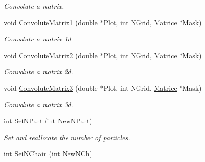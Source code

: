 \begin{DoxyCompactItemize}
\begin{DoxyCompactList}\small\item\em Convolute a matrix. \end{DoxyCompactList}\item 
void \hyperlink{classVarData_aa71815f5a54d45211d2e36f338010741}{Convolute\+Matrix1} (double $\ast$Plot, int N\+Grid, \hyperlink{classMatrice}{Matrice} $\ast$Mask)\hypertarget{classVarData_aa71815f5a54d45211d2e36f338010741}{}\label{classVarData_aa71815f5a54d45211d2e36f338010741}

\begin{DoxyCompactList}\small\item\em Convolute a matrix 1d. \end{DoxyCompactList}\item 
void \hyperlink{classVarData_a66364ab1a4bcb0748e0548b1f15447af}{Convolute\+Matrix2} (double $\ast$Plot, int N\+Grid, \hyperlink{classMatrice}{Matrice} $\ast$Mask)\hypertarget{classVarData_a66364ab1a4bcb0748e0548b1f15447af}{}\label{classVarData_a66364ab1a4bcb0748e0548b1f15447af}

\begin{DoxyCompactList}\small\item\em Convolute a matrix 2d. \end{DoxyCompactList}\item 
void \hyperlink{classVarData_a1a475106efeb1fdfddaed3f6a069d199}{Convolute\+Matrix3} (double $\ast$Plot, int N\+Grid, \hyperlink{classMatrice}{Matrice} $\ast$Mask)\hypertarget{classVarData_a1a475106efeb1fdfddaed3f6a069d199}{}\label{classVarData_a1a475106efeb1fdfddaed3f6a069d199}

\begin{DoxyCompactList}\small\item\em Convolute a matrix 3d. \end{DoxyCompactList}\item 
int \hyperlink{classVarData_a2e0b2cd0414a0994122e1dfae41e57b8}{Set\+N\+Part} (int New\+N\+Part)\hypertarget{classVarData_a2e0b2cd0414a0994122e1dfae41e57b8}{}\label{classVarData_a2e0b2cd0414a0994122e1dfae41e57b8}

\begin{DoxyCompactList}\small\item\em Set and reallocate the number of particles. \end{DoxyCompactList}\item 
int \hyperlink{classVarData_a868e00b8cdabb8ea14fcec15942725ae}{Set\+N\+Chain} (int New\+N\+Ch)\hypertarget{classVarData_a868e00b8cdabb8ea14fcec15942725ae}{}\label{classVarData_a868e00b8cdabb8ea14fcec15942725ae}


\end{DoxyCompactItemize}
